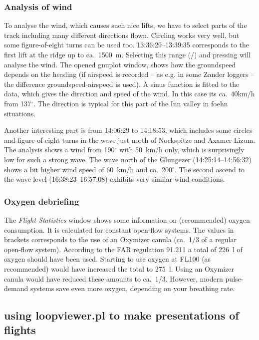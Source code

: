 \subsubsection{Analysis of wind}
To analyse the wind, which causes such nice lifts, we have to select parts of the track including many different directions flown. Circling works very well, but some figure-of-eight turns can be used too.
13:36:29--13:39:35 corresponds to the first lift at the ridge up to ca.~1500~m. Selecting this range (/) and pressing  will analyse the wind. The opened gnuplot window, shows how the groundspeed depends on the heading (if airspeed is recorded -- as e.g. in some Zander loggers -- the difference groundspeed-airspeed is used). A sinus function is fitted to the data, which gives the direction and speed of the wind. In this case its ca.~40km/h from 137$^\circ$. The direction is typical for this part of the Inn valley in foehn situations.

Another interesting part is from 14:06:29 to 14:18:53, which includes some circles and figure-of-eight turns in the wave just north of Nockspitze and Axamer Lizum. The analysis shows a wind from 190$^\circ$ with 50~km/h only, which is surprisingly low for such a strong wave.
The wave north of the Glungezer (14:25:14--14:56:32) shows a bit higher wind speed of 60~km/h and ca.~200$^\circ$.
The second ascend to the wave level (16:38:23--16:57:08) exhibits very similar wind conditions.

\subsubsection{Oxygen debriefing}
The \emph{Flight Statistics} window shows some information on (recommended) oxygen consumption. It is calculated for constant open-flow systems. The values in brackets corresponds to the use of an Oxymizer canula (ca.~1/3 of a regular open-flow system).
According to the FAR regulation 91.211 a total of 226~l of oxygen should have been used. Starting to use oxygen at FL100 (as recommended) would have increased the total to 275~l. Using an Oxymizer canula would have reduced these amounts to ca.~1/3.
However, modern pulse-demand systems save even more oxygen, depending on your breathing rate.


\clearpage

\subsection{using loopviewer.pl to make presentations of flights}

